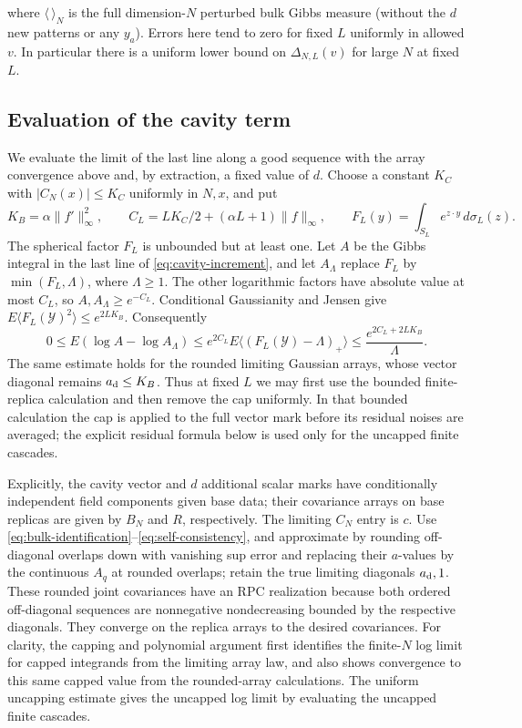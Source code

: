 \documentclass[11pt]{article}
\begin{document}
where $\langle\,\rangle_N$ is the full dimension-$N$ perturbed bulk Gibbs measure (without the $d$ new patterns or any $y_a$). Errors here tend to zero for fixed $L$ uniformly in allowed $v$. In particular there is a uniform lower bound on $\Delta_{N,L}(v)$ for large $N$ at fixed $L$.

\subsection{Evaluation of the cavity term}

We evaluate the limit of the last line along a good sequence with the array convergence above and, by extraction, a fixed value of $d$. Choose a constant $K_C$ with
$|C_N(x)|\le K_C$ uniformly in $N,x$, and put
\[
 K_B=\alpha\|f'\|_\infty^2,\qquad
 C_L=LK_C/2+(\alpha L+1)\|f\|_\infty,
 \qquad F_L(y)=\int_{S_L}e^{z\cdot y}\,d\sigma_L(z).
\]
The spherical factor $F_L$ is unbounded but at least one. Let $A$ be the Gibbs
integral in the last line of \eqref{eq:cavity-increment}, and let $A_\Lambda$ replace $F_L$ by
$\min(F_L,\Lambda)$, where $\Lambda\ge1$. The other logarithmic factors have
absolute value at most $C_L$, so $A,A_\Lambda\ge e^{-C_L}$. Conditional
Gaussianity and Jensen give $E\langle F_L(\mathcal Y)^2\rangle\le e^{2LK_B}$.
Consequently
\[
 0\le E(\log A-\log A_\Lambda)
 \le e^{2C_L}E\langle(F_L(\mathcal Y)-\Lambda)_+\rangle
 \le \frac{e^{2C_L+2LK_B}}{\Lambda}.
\]
The same estimate holds for the rounded limiting Gaussian arrays, whose
vector diagonal remains $a_{\rm d}\le K_B$. Thus at fixed $L$ we may first
use the bounded finite-replica calculation and then remove the cap uniformly.
In that bounded calculation the cap is applied to the full vector mark before
its residual noises are averaged; the explicit residual formula below is used
only for the uncapped finite cascades.

Explicitly, the cavity vector and $d$ additional scalar marks have conditionally independent field components given base data; their covariance arrays on base replicas are given by $B_N$ and $R$, respectively. The limiting $C_N$ entry is $c$. Use \eqref{eq:bulk-identification}--\eqref{eq:self-consistency}, and approximate by rounding off-diagonal overlaps down with vanishing sup error and replacing their $a$-values by the continuous $A_q$ at rounded overlaps; retain the true limiting diagonals $a_{\rm d},1$. These rounded joint covariances have an RPC realization because both ordered off-diagonal sequences are nonnegative nondecreasing bounded by the respective diagonals. They converge on the replica arrays to the desired covariances. For clarity, the capping and polynomial argument first identifies the finite-$N$ log limit for capped integrands from the limiting array law, and also shows convergence to this same capped value from the rounded-array calculations. The uniform uncapping estimate gives the uncapped log limit by evaluating the uncapped finite cascades.
\end{document}
